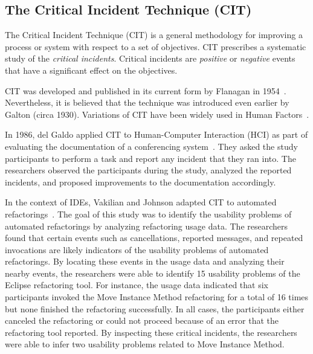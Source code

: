 
 
\subsection{The Critical Incident Technique (CIT)}

The Critical Incident Technique (CIT) is a general methodology for improving a
process or system with respect to a set of objectives. CIT prescribes a
systematic study of the \emph{critical incidents}. Critical incidents are
\emph{positive} or \emph{negative} events that have a significant effect on the
objectives.

CIT was developed and published in its current form by Flanagan in
1954~\cite{Flanagan1954CIT}. Nevertheless, it is believed that the technique was
introduced even earlier by Galton (circa 1930). Variations of CIT have been
widely used in Human Factors~\cite{ShattuckWoods1994CIT}.

In 1986, del Galdo \etal applied CIT to Human-Computer Interaction (HCI) as part
of evaluating the documentation of a conferencing system~\cite{DelGaldo1986CIT}.
They asked the study participants to perform a task and report any incident that
they ran into. The researchers observed the participants during the study,
analyzed the reported incidents, and proposed improvements to the documentation
accordingly.

In the context of IDEs, Vakilian and Johnson adapted CIT to automated
refactorings~\cite{VakilianJohnson2014Alternate}. The goal of this study was to
identify the usability problems of automated refactorings by analyzing
refactoring usage data. The researchers found that certain events such as
cancellations, reported messages, and repeated invocations are likely indicators
of the usability problems of automated refactorings. By locating these events in
the usage data and analyzing their nearby events, the researchers were able to
identify 15 usability problems of the Eclipse refactoring tool. For instance,
the usage data indicated that six participants invoked the Move Instance Method
refactoring for a total of 16 times but none finished the refactoring
successfully. In all cases, the participants either canceled the refactoring or
could not proceed because of an error that the refactoring tool reported. By
inspecting these critical incidents, the researchers were able to infer two
usability problems related to Move Instance Method.

